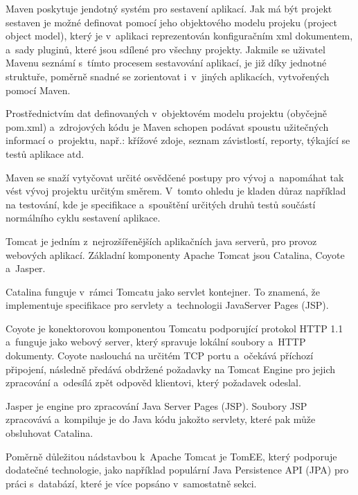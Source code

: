 \documentclass[12pt]{article}
\begin{document}
{%
Maven poskytuje jendotný systém pro sestavení aplikací. 
Jak má být projekt sestaven je možné definovat pomocí 
jeho objektového modelu projeku (project object model),
který je v~aplikaci reprezentován konfiguračním xml dokumentem, 
a~sady pluginů, které jsou sdílené pro všechny projekty.
Jakmile se uživatel Mavenu seznámí s~tímto procesem sestavování aplikací,
je již díky jednotné struktuře, poměrně snadné se zorientovat i~v~jiných aplikacích,
vytvořených pomocí Maven.

Prostřednictvím dat definovaných v~objektovém modelu projektu (obyčejně pom.xml)
a~zdrojových kódu je Maven schopen podávat spoustu užitečných informací o~projektu,
např.: křížové zdoje, seznam závistlostí, reporty, týkající se testů aplikace atd.

Maven se snaží vytyčovat určité osvědčené postupy pro vývoj
a~napomáhat tak vést vývoj projektu určitým směrem. 
V~tomto ohledu je kladen důraz například na testování,
kde je specifikace a~spouštění určitých druhů testů
součástí normálního cyklu sestavení aplikace.
\cite{maven}


Tomcat je jedním z~nejrozšířenějších aplikačních java serverů, 
pro provoz webových aplikací. 
Základní komponenty Apache Tomcat jsou Catalina, Coyote a~Jasper.

Catalina funguje v~rámci Tomcatu jako servlet kontejner. 
To znamená, že implementuje specifikace pro servlety a~technologii JavaServer Pages (JSP).

Coyote je konektorovou komponentou Tomcatu podporující protokol HTTP 1.1 
a~funguje jako webový server, který spravuje lokální soubory a~HTTP dokumenty.
Coyote naslouchá na určitém TCP portu a~očekává příchozí připojení,
následně předává obdržené požadavky na Tomcat Engine pro jejich zpracování
a~odesílá zpět odpověd klientovi, který požadavek odeslal.

Jasper je engine pro zpracování Java Server Pages (JSP).
Soubory JSP zpracovává a~kompiluje je do Java kódu jakožto servlety,
které pak může obsluhovat Catalina.

\cite{tomcatWikipedia}

Poměrně důležitou nádstavbou k~Apache Tomcat je TomEE,
který podporuje dodatečné technologie,
jako například populární Java Persistence API (JPA) pro práci s~databází,
které je více popsáno v~samostatně sekci.

}
\end{document}
